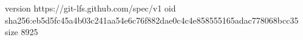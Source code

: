 version https://git-lfs.github.com/spec/v1
oid sha256:eb5d5fc45a4b03c241aa54e6c76f882dae0c4c4e858555165adac778068bcc35
size 8925
